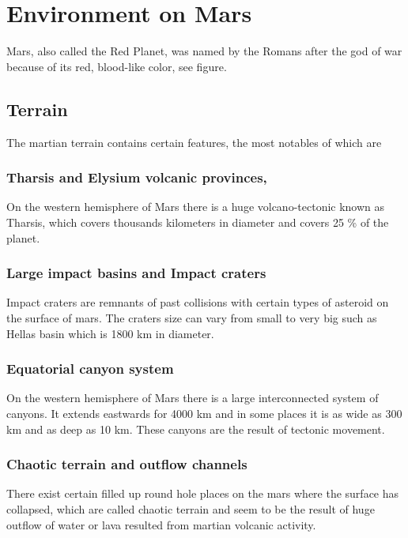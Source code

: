 \chapter{Environment on Mars}\label{ch:environmentOnMars}

Mars, also called the Red Planet, was named by the Romans after the god of war because of its red, blood-like color, see figure. 

\section{Terrain} 
The martian terrain contains certain features, the most notables of which are

\subsection{Tharsis and Elysium volcanic provinces,}
On the western hemisphere of Mars there is a huge volcano-tectonic known as Tharsis, which covers thousands kilometers in diameter and covers 25 \% of the planet\cite{surface}. %

\subsection{Large impact basins and Impact craters}
Impact craters are remnants of past collisions with certain types of asteroid on the surface of mars. The craters size can vary from small to very big such as Hellas basin which is 1800 km in diameter.


\subsection{Equatorial canyon system}
On the western hemisphere of Mars there is a large interconnected system of canyons. It extends eastwards for 4000 km and in some places it is as wide as 300 km and as deep as 10 km. These canyons are the result of tectonic movement.

\subsection{Chaotic terrain and outflow channels}
There exist certain filled up round hole places on the mars where the surface has collapsed, which are called chaotic terrain and seem to be the result of huge outflow of water or lava resulted from martian volcanic activity.

